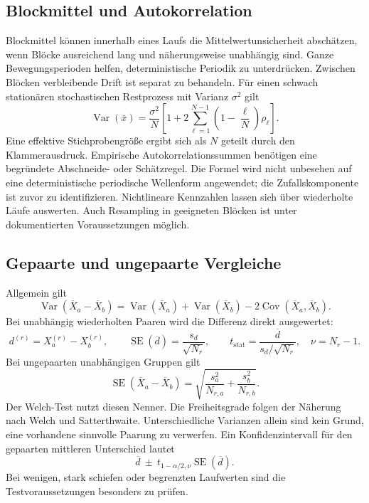 \documentclass[11pt,a4paper]{article}
\newcommand{\Var}{\operatorname{Var}}
\newcommand{\Cov}{\operatorname{Cov}}
\newcommand{\SE}{\operatorname{SE}}
\begin{document}
\subsection{Blockmittel und Autokorrelation}
Blockmittel können innerhalb eines Laufs die Mittelwertunsicherheit abschätzen, wenn Blöcke ausreichend lang und näherungsweise unabhängig sind. Ganze Bewegungsperioden helfen, deterministische Periodik zu unterdrücken. Zwischen Blöcken verbleibende Drift ist separat zu behandeln.
Für einen schwach stationären stochastischen Restprozess mit Varianz $\sigma^2$ gilt
\begin{equation}
\Var(\overline x)=\frac{\sigma^2}{N}\left[1+2\sum_{\ell=1}^{N-1}\left(1-\frac\ell N\right)\rho_\ell\right].
\label{eq:acf}
\end{equation}
Eine effektive Stichprobengröße ergibt sich als $N$ geteilt durch den Klammerausdruck. Empirische Autokorrelationssummen benötigen eine begründete Abschneide- oder Schätzregel. Die Formel wird nicht unbesehen auf eine deterministische periodische Wellenform angewendet; die Zufallskomponente ist zuvor zu identifizieren. Nichtlineare Kennzahlen lassen sich über wiederholte Läufe auswerten. Auch Resampling in geeigneten Blöcken ist unter dokumentierten Voraussetzungen möglich.

\subsection{Gepaarte und ungepaarte Vergleiche}
Allgemein gilt
\begin{equation}
\Var(\overline X_a-\overline X_b)=\Var(\overline X_a)+\Var(\overline X_b)-2\Cov(\overline X_a,\overline X_b).
\end{equation}
Bei unabhängig wiederholten Paaren wird die Differenz direkt ausgewertet:
\begin{equation}
d^{(r)}=X_a^{(r)}-X_b^{(r)},\qquad
\SE(\overline d)=\frac{s_d}{\sqrt{N_r}},\qquad
 t_{\mathrm{stat}}=\frac{\overline d}{s_d/\sqrt{N_r}},\quad \nu=N_r-1.
\label{eq:paired}
\end{equation}
Bei ungepaarten unabhängigen Gruppen gilt
\begin{equation}
\SE(\overline X_a-\overline X_b)=\sqrt{\frac{s_a^2}{N_{r,a}}+\frac{s_b^2}{N_{r,b}}}.
\end{equation}
Der Welch-Test nutzt diesen Nenner. Die Freiheitsgrade folgen der Näherung nach Welch und Satterthwaite. Unterschiedliche Varianzen allein sind kein Grund, eine vorhandene sinnvolle Paarung zu verwerfen. Ein Konfidenzintervall für den gepaarten mittleren Unterschied lautet
\begin{equation}
\overline d\ \pm\ t_{1-\alpha/2,\nu}\SE(\overline d).
\end{equation}
Bei wenigen, stark schiefen oder begrenzten Laufwerten sind die Testvoraussetzungen besonders zu prüfen.
\end{document}
